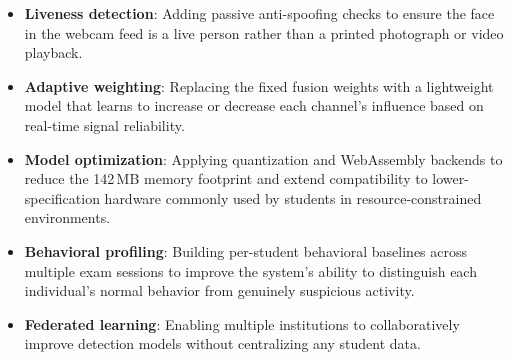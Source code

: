 \documentclass[conference]{IEEEtran}
\begin{document}
\begin{itemize}
    \item \textbf{Liveness detection}: Adding passive anti-spoofing checks to ensure the face in the webcam feed is a live person rather than a printed photograph or video playback.
    \item \textbf{Adaptive weighting}: Replacing the fixed fusion weights with a lightweight model that learns to increase or decrease each channel's influence based on real-time signal reliability.
    \item \textbf{Model optimization}: Applying quantization and WebAssembly backends to reduce the 142\,MB memory footprint and extend compatibility to lower-specification hardware commonly used by students in resource-constrained environments.
    \item \textbf{Behavioral profiling}: Building per-student behavioral baselines across multiple exam sessions to improve the system's ability to distinguish each individual's normal behavior from genuinely suspicious activity.
    \item \textbf{Federated learning}: Enabling multiple institutions to collaboratively improve detection models without centralizing any student data.
\end{itemize}



\end{document}
